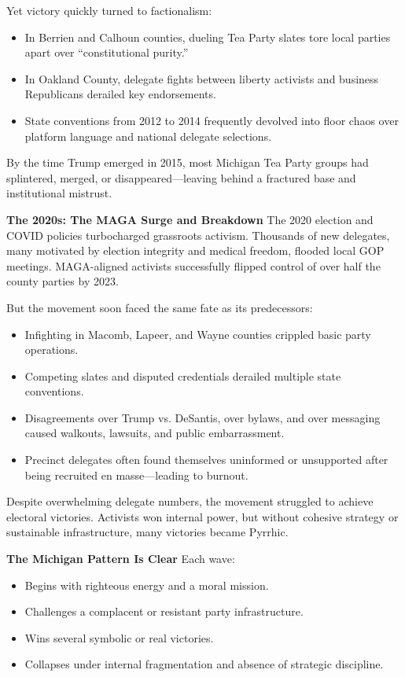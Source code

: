 Yet victory quickly turned to factionalism:
\begin{itemize}
\item In Berrien and Calhoun counties, dueling Tea Party slates tore local parties apart over “constitutional purity.”
\item In Oakland County, delegate fights between liberty activists and business Republicans derailed key endorsements.
\item State conventions from 2012 to 2014 frequently devolved into floor chaos over platform language and national delegate selections.
\end{itemize}

By the time Trump emerged in 2015, most Michigan Tea Party groups had splintered, merged, or disappeared—leaving behind a fractured base and institutional mistrust.

\textbf{The 2020s: The MAGA Surge and Breakdown}
The 2020 election and COVID policies turbocharged grassroots activism. Thousands of new delegates, many motivated by election integrity and medical freedom, flooded local GOP meetings. MAGA-aligned activists successfully flipped control of over half the county parties by 2023.

But the movement soon faced the same fate as its predecessors:
\begin{itemize}
\item Infighting in Macomb, Lapeer, and Wayne counties crippled basic party operations.
\item Competing slates and disputed credentials derailed multiple state conventions.
\item Disagreements over Trump vs. DeSantis, over bylaws, and over messaging caused walkouts, lawsuits, and public embarrassment.
\item Precinct delegates often found themselves uninformed or unsupported after being recruited en masse—leading to burnout.
\end{itemize}

Despite overwhelming delegate numbers, the movement struggled to achieve electoral victories. Activists won internal power, but without cohesive strategy or sustainable infrastructure, many victories became Pyrrhic.

\textbf{The Michigan Pattern Is Clear}
Each wave:
\begin{itemize}
\item Begins with righteous energy and a moral mission.
\item Challenges a complacent or resistant party infrastructure.
\item Wins several symbolic or real victories.
\item Collapses under internal fragmentation and absence of strategic discipline.
\end{itemize}

